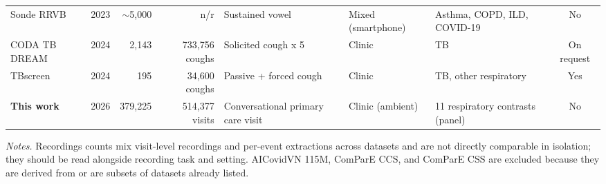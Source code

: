 \documentclass[utf8]{FrontiersinHarvard} %
\begin{document}
\begin{table}[ht]
{\begin{tabular}{@{}l c r r l l l c@{}}
Sonde RRVB \citep{sonde-rrvb-jmir-2023} & 2023 & $\sim$5{,}000 & n/r & Sustained vowel & Mixed (smartphone) & Asthma, COPD, ILD, COVID-19 & No \\
CODA TB DREAM \citep{coda-tb-dream-2024} & 2024 & 2{,}143 & 733{,}756 coughs & Solicited cough x 5 & Clinic & TB & On request \\
TBscreen \citep{tbscreen-2024} & 2024 & 195 & 34{,}600 coughs & Passive + forced cough & Clinic & TB, other respiratory & Yes \\
\midrule
\textbf{This work} & 2026 & 379{,}225 & 514{,}377 visits & Conversational primary care visit & Clinic (ambient) & 11 respiratory contrasts (panel) & No \\
\bottomrule
\end{tabular}%
}
\begin{flushleft}
\footnotesize
\textit{Notes.} Recordings counts mix visit-level recordings and per-event extractions across datasets and are not directly comparable in isolation; they should be read alongside recording task and setting. AICovidVN 115M, ComParE CCS, and ComParE CSS are excluded because they are derived from or are subsets of datasets already listed.
\end{flushleft}
\end{table}
\end{document}
